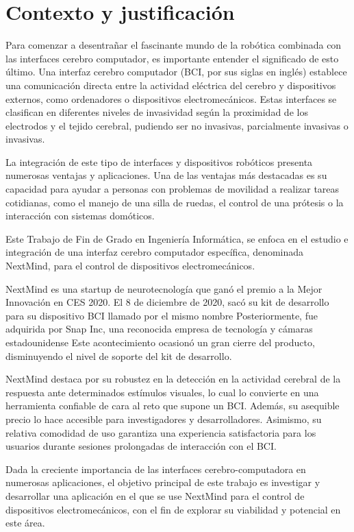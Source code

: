 \section{Contexto y justificación}

Para comenzar a desentrañar el fascinante mundo de la robótica combinada con las interfaces cerebro computador, es importante entender el significado de esto último. Una interfaz cerebro computador (BCI, por sus siglas en inglés) establece una comunicación directa entre la actividad eléctrica del cerebro y dispositivos externos, como ordenadores o dispositivos electromecánicos. Estas interfaces se clasifican en diferentes niveles de invasividad según la proximidad de los electrodos y el tejido cerebral, pudiendo ser no invasivas, parcialmente invasivas o invasivas.



La integración de este tipo de interfaces y dispositivos robóticos presenta numerosas ventajas y aplicaciones. Una de las ventajas más destacadas es su capacidad para ayudar a personas con problemas de movilidad a realizar tareas cotidianas, como el manejo de una silla de ruedas, el control de una prótesis o la interacción con sistemas domóticos.



Este Trabajo de Fin de Grado en Ingeniería Informática, se enfoca en el estudio e integración de una interfaz cerebro computador específica, denominada NextMind, para el control de dispositivos electromecánicos.



NextMind es una startup de neurotecnología que ganó el premio a la Mejor Innovación en CES 2020. El 8 de diciembre de 2020, sacó su kit de desarrollo para su dispositivo BCI llamado por el mismo nombre \cite{BusinessWire2020} Posteriormente, fue adquirida por Snap Inc, una reconocida empresa de tecnología y cámaras estadounidense\cite{SnapInc} Este acontecimiento ocasionó un gran cierre del producto, disminuyendo el nivel de soporte del kit de desarrollo. %



NextMind destaca por su robustez en la detección  en la actividad cerebral de la respuesta ante determinados est\'imulos visuales, lo cual lo convierte en una herramienta confiable de cara al reto que supone un BCI. Además, su asequible precio lo hace accesible para investigadores y desarrolladores. Asimismo, su relativa comodidad de uso garantiza una experiencia satisfactoria para los usuarios durante sesiones prolongadas de interacción con el BCI.



Dada la creciente importancia de las interfaces cerebro-computadora en numerosas aplicaciones, el objetivo principal de este trabajo es investigar y desarrollar una aplicación en el que se use NextMind para el control de dispositivos electromecánicos, con el fin de explorar su viabilidad y potencial en este área.